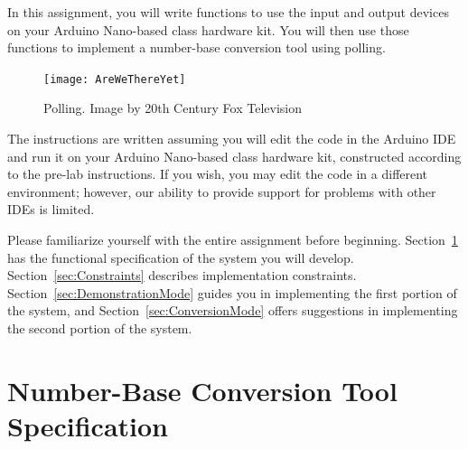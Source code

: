 

\usepackage{graphicx}
\usepackage{addfont}
\usepackage{wrapfig}
\usepackage{multicol}

\renewcommand{\labnumber}{9}
\renewcommand{\labname}{Using Polling with Memory-Mapped Input/Output}
\renewcommand{\shortlabname}{memory-mapped i/o -- pollinglab}
\renewcommand{\collaborationrules}{\individualeffort}
\renewcommand{\duedate}{Before the start of your lab section on November 10, 15, or 16}
\newcommand{\nano}{Arduino Nano}
\renewcommand{\runtimeenvironment}{your \nano-based class hardware kit}

\startdocument

In this assignment, you will write functions to use the input and output
devices on \runtimeenvironment. You will then use those functions to implement
a number-base conversion tool using polling.

\begin{figure}[h]
    \centering
    \texttt{[image: AreWeThereYet]}
    \caption{Polling. \tiny Image by 20th Century Fox Television}
\end{figure}

The instructions are written assuming you will edit the code in the Arduino IDE
and run it on \runtimeenvironment, constructed according to the pre-lab
instructions. If you wish, you may edit the code in a different environment;
however, our ability to provide support for problems with other IDEs is limited.

Please familiarize yourself with the entire assignment before beginning.
Section~\ref{sec:FunctionalSpecification} has the functional specification of
the system you will develop. Section~\ref{sec:Constraints} describes
implementation constraints. Section~\ref{sec:DemonstrationMode} guides you in
implementing the first portion of the system, and
Section~\ref{sec:ConversionMode} offers suggestions in implementing the second
portion of the system.

\section{Number-Base Conversion Tool Specification} \label{sec:FunctionalSpecification}

